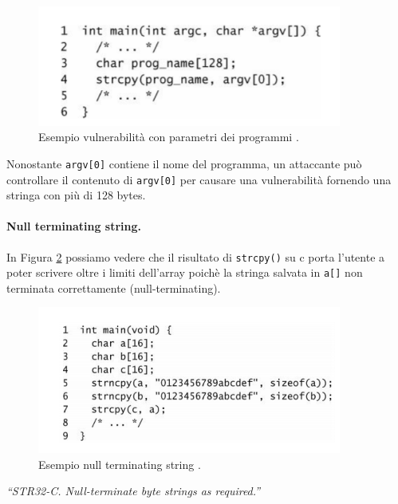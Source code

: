 \begin{figure}[H]
    \centering
    \includegraphics[width=10cm, keepaspectratio]{capitoli/secure_coding/img/cap_2/parametri_funzioni.png}
    \caption{Esempio vulnerabilità con parametri dei programmi .}\label{fig:parametri_programmi}
\end{figure}
Nonostante \verb|argv[0]| contiene il nome del programma, un attaccante può controllare il contenuto di \verb|argv[0]| per causare una vulnerabilità fornendo una stringa con più di 128 bytes.

\paragraph{Null terminating string.}
In Figura \ref{fig:null_string} possiamo vedere che il risultato di \verb|strcpy()| su c porta l'utente a poter scrivere oltre i limiti dell'array poichè la stringa salvata in \verb|a[]| non terminata correttamente (null-terminating).


\begin{figure}[H]
    \centering
    \includegraphics[width=10cm, keepaspectratio]{capitoli/secure_coding/img/cap_2/null_string.png}
    \caption{Esempio null terminating string .}\label{fig:null_string}
\end{figure}
\textit{“STR32-C. Null-terminate byte strings as
    required.”}

